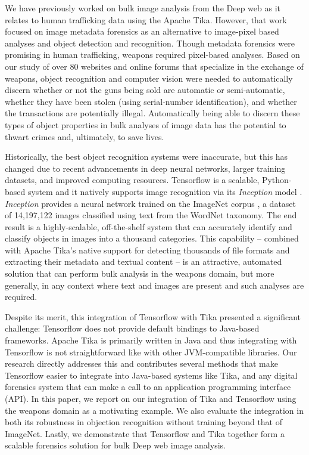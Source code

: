 
We have previously worked on bulk image analysis from the Deep web as it relates to human trafficking data \cite{mattmann7tg} using the Apache Tika. However, that work focused on image metadata forensics as an alternative to image-pixel based analyses and object detection and recognition. Though metadata forensics were promising in human trafficking, weapons required pixel-based analyses. Based on our study of over 80 websites and online forums that specialize in the exchange of weapons, object recognition and computer vision were needed to automatically discern whether or not the guns being sold are automatic or semi-automatic, whether they have been stolen (using serial-number identification), and whether the transactions are potentially illegal. Automatically being able to discern these types of object properties in bulk analyses of image data has the potential to thwart crimes and, ultimately, to save lives.

Historically, the best object recognition systems were inaccurate, but this has changed due to recent advancements in deep neural networks, larger training datasets, and improved computing resources. Tensorflow is a scalable, Python-based system and it natively supports image recognition via its \textit{Inception} model \cite{abadi2016tensorflow}. \textit{Inception} provides a neural network trained on the ImageNet corpus \cite{krizhevsky2012imagenet}, a dataset of 14,197,122 images classified using text from the WordNet taxonomy. The end result is a highly-scalable, off-the-shelf system that can accurately identify and classify objects in images into a thousand categories. This capability -- combined with Apache Tika's native support for detecting thousands of file formats and extracting their metadata and textual content -- is an attractive, automated solution that can perform bulk analysis in the weapons domain, but more generally, in any context where text and images are present and such analyses are required.

Despite its merit, this integration of Tensorflow with Tika presented a significant challenge: Tensorflow does not provide default bindings to Java-based frameworks. Apache Tika is primarily written in Java and thus integrating with Tensorflow is not straightforward like with other JVM-compatible libraries. Our research directly addresses this and contributes several methods that make Tensorflow easier to integrate into Java-based systems like Tika, and any digital forensics system that can make a call to an application programming interface (API). In this paper, we report on our integration of Tika and Tensorflow using the weapons domain as a motivating example. We also evaluate the integration in both its robustness in objection recognition without training beyond that of ImageNet. Lastly, we demonstrate that Tensorflow and Tika together form  a scalable forensics solution for bulk Deep web image analysis.

